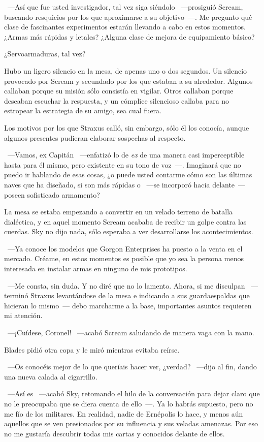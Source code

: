 ~---Así que fue usted investigador, tal vez siga siéndolo ~---prosiguió Scream, buscando resquicios por los que aproximarse a su objetivo~---. Me pregunto qué clase de fascinantes experimentos estarán llevando a cabo en estos momentos. ¿Armas más rápidas y letales? ¿Alguna clase de mejora de equipamiento básico?

\rquoti ¿Servoarmaduras, tal vez?

Hubo un ligero silencio en la mesa, de apenas uno o dos segundos. Un silencio provocado por Scream y secundado por los que estaban a su alrededor. Algunos callaban porque su misión sólo consistía en vigilar. Otros callaban porque deseaban escuchar la respuesta, y un cómplice silencioso callaba para no estropear la estrategia de su amigo, sea cual fuera.

Los motivos por los que Straxus calló, sin embargo, sólo él los conocía, aunque algunos presentes pudieran elaborar sospechas al respecto.

~---Vamos, ex Capitán ~---enfatizó lo de \emph{ex} de una manera casi imperceptible hasta para él mismo, pero existente en su tono de voz~---. Imaginará que no puedo ir hablando de esas cosas, ¿o puede usted contarme cómo son las últimas naves que ha diseñado, si son más rápidas o ~---se incorporó hacia delante~--- poseen sofisticado armamento?

La mesa se estaba empezando a convertir en un velado terreno de batalla dialéctica, y en aquel momento Scream acababa de recibir un golpe contra las cuerdas. Sky no dijo nada, sólo esperaba a ver desarrollarse los acontecimientos.

~---Ya conoce los modelos que Gorgon Enterprises ha puesto a la venta en el mercado. Créame, en estos momentos es posible que yo sea la persona menos interesada en instalar armas en ninguno de mis prototipos.

~---Me consta, sin duda. Y no diré que no lo lamento. Ahora, si me disculpan ~---terminó Straxus levantándose de la mesa e indicando a sus guardaespaldas que hicieran lo mismo~--- debo marcharme a la base, importantes asuntos requieren mi atención.

~---¡Cuídese, Coronel! ~---acabó Scream saludando de manera vaga con la mano.

Blades pidió otra copa y le miró mientras evitaba reírse.

~---Os conocéis mejor de lo que queríais hacer ver, ¿verdad? ~---dijo al fin, dando una nueva calada al cigarrillo.

~---Así es ~---acabó Sky, retomando el hilo de la conversación para dejar claro que no le preocupaba que se diera cuenta de ello~---. Ya lo habrás supuesto, pero no me fío de los militares. En realidad, nadie de Ernépolis lo hace, y menos aún aquellos que se ven presionados por su influencia y sus veladas amenazas. Por eso no me gustaría descubrir todas mis cartas y conocidos delante de ellos.


